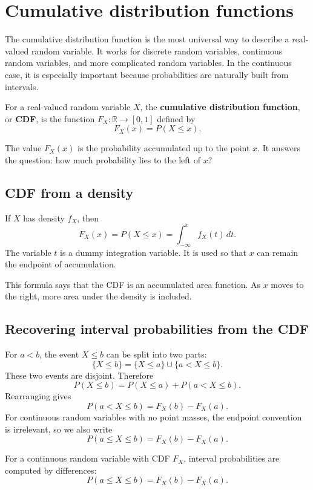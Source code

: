 \section{Cumulative distribution functions}

The cumulative distribution function is the most universal way to describe a
real-valued random variable. It works for discrete random variables, continuous
random variables, and more complicated random variables. In the continuous case,
it is especially important because probabilities are naturally built from
intervals.

\begin{definitionbox}
For a real-valued random variable \(X\), the \textbf{cumulative distribution
function}, or \textbf{CDF}, is the function \(F_X:\mathbb{R}\to[0,1]\) defined by
\[
F_X(x)=P(X\leq x).
\]
\end{definitionbox}

The value \(F_X(x)\) is the probability accumulated up to the point \(x\). It
answers the question: how much probability lies to the left of \(x\)?

\subsection*{CDF from a density}

If \(X\) has density \(f_X\), then
\[
F_X(x)=P(X\leq x)=\int_{-\infty}^{x}f_X(t)\,dt.
\]
The variable \(t\) is a dummy integration variable. It is used so that \(x\) can
remain the endpoint of accumulation.

This formula says that the CDF is an accumulated area function. As \(x\) moves to
the right, more area under the density is included.

\subsection*{Recovering interval probabilities from the CDF}

For \(a<b\), the event \(X\leq b\) can be split into two parts:
\[
\{X\leq b\}=\{X\leq a\}\cup\{a<X\leq b\}.
\]
These two events are disjoint. Therefore
\[
P(X\leq b)=P(X\leq a)+P(a<X\leq b).
\]
Rearranging gives
\[
P(a<X\leq b)=F_X(b)-F_X(a).
\]
For continuous random variables with no point masses, the endpoint convention is
irrelevant, so we also write
\[
P(a\leq X\leq b)=F_X(b)-F_X(a).
\]

\begin{theorembox}
For a continuous random variable with CDF \(F_X\), interval probabilities are
computed by differences:
\[
P(a\leq X\leq b)=F_X(b)-F_X(a).
\]
\end{theorembox}

